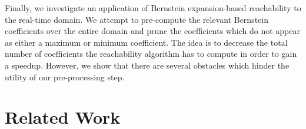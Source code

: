 Finally, we investigate an application of Bernstein expansion-based reachability to the real-time domain.
%
We attempt to pre-compute the relevant Bernstein coefficients over the entire domain and prune the coefficients which do not appear as either a maximum or minimum coefficient.
%
The idea is to decrease the total number of coefficients the reachability algorithm has to compute in order to gain a speedup.
%
However, we show that there are several obstacles which hinder the utility of our pre-processing step.



\section{Related Work}
\label{sec:related}

